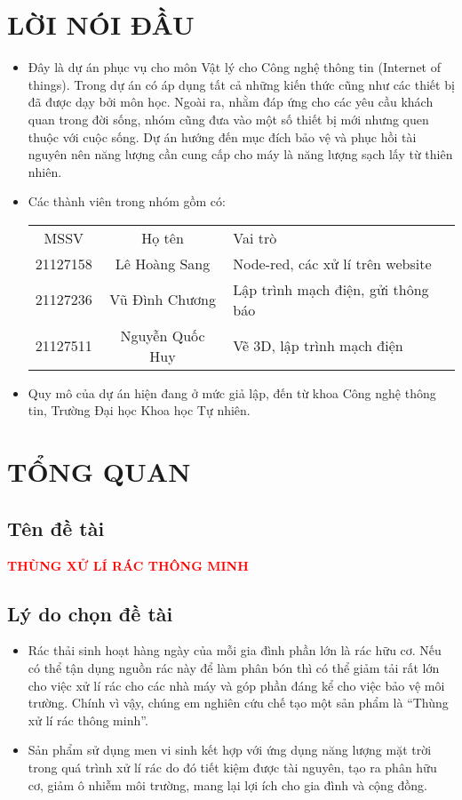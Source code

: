 \documentclass[12pt, a4paper]{article}
\begin{document}
\section{LỜI NÓI ĐẦU}
\begin{itemize}
    \item Đây là dự án phục vụ cho môn Vật lý cho Công nghệ thông tin (Internet of things). 
    Trong dự án có áp dụng tất cả những kiến thức cũng như các thiết bị đã được dạy bởi môn học. 
    Ngoài ra, nhằm đáp ứng cho các yêu cầu khách quan trong đời sống, nhóm cũng đưa vào một số thiết bị mới nhưng quen thuộc với cuộc sống. 
    Dự án hướng đến mục đích bảo vệ và phục hồi tài nguyên nên năng lượng cần cung cấp cho máy là năng lượng sạch lấy từ thiên nhiên.
    \item Các thành viên trong nhóm gồm có:
    \begin{table}[htp]
        \centering
        \begin{tabular}{|c|c|l|}
        \cline{1-3}
        MSSV     & Họ tên            &  Vai trò \\ \cline{1-3} 
        21127158 & Lê Hoàng Sang     &  Node-red, các xử lí trên website\\ \cline{1-3}
        21127236 & Vũ Đình Chương    &  Lập trình mạch điện, gửi thông báo\\ \cline{1-3}
        21127511 & Nguyễn Quốc Huy   &  Vẽ 3D, lập trình mạch điện\\ \cline{1-3} 
        \end{tabular}
    \end{table}
    \item Quy mô của dự án hiện đang ở mức giả lập, đến từ khoa Công nghệ thông tin, Trường Đại học Khoa học Tự nhiên.
\end{itemize}
\section{TỔNG QUAN}

\subsection{Tên đề tài}
\begin{center}
    \textcolor{red}{\Large\textbf{{THÙNG XỬ LÍ RÁC THÔNG MINH}}}
\end{center}
\subsection{Lý do chọn đề tài}
\begin{itemize}
    \item Rác thải sinh hoạt hàng ngày của mỗi gia đình phần lớn là rác hữu cơ. 
Nếu có thể tận dụng nguồn rác này để làm phân bón thì có thể giảm tải rất lớn cho việc xử lí rác cho các nhà máy và góp phần đáng kể cho việc bảo vệ môi trường. 
Chính vì vậy, chúng em nghiên cứu chế tạo một sản phẩm là “Thùng xử lí rác thông minh”.
    \item Sản phẩm sử dụng men vi sinh kết hợp với ứng dụng năng lượng mặt trời trong quá trình xử lí rác do đó tiết kiệm được tài nguyên, tạo ra phân hữu cơ, giảm ô nhiễm môi trường, mang lại lợi ích cho gia đình và cộng đồng.
\end{itemize}
\end{document}
